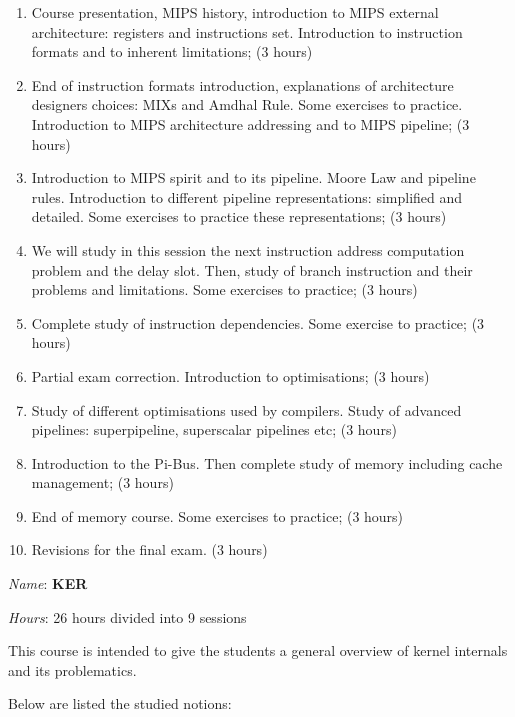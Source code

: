 \begin{multicols}{2}
\begin{enumerate}
  \item
    Course presentation, MIPS history, introduction to MIPS external
    architecture: registers and instructions set. Introduction to
    instruction formats and to inherent limitations; (3 hours)
  \item
    End of instruction formats introduction, explanations of architecture
    designers choices: MIXs and Amdhal Rule. Some exercises to practice.
    Introduction to MIPS architecture addressing and to MIPS pipeline;
    (3 hours)
  \item
    Introduction to MIPS spirit and to its pipeline. Moore Law and
    pipeline rules. Introduction to different pipeline representations:
    simplified and detailed. Some exercises to practice these representations;
    (3 hours)
  \item
    We will study in this session the next instruction address computation
    problem and the delay slot. Then, study of branch instruction and their
    problems and limitations. Some exercises to practice; (3 hours)
  \item
    Complete study of instruction dependencies. Some exercise to practice;
    (3 hours)
  \item
    Partial exam correction. Introduction to optimisations; (3 hours)
  \item
    Study of different optimisations used by compilers. Study of
    advanced pipelines: superpipeline, superscalar pipelines etc; (3 hours)
  \item
    Introduction to the Pi-Bus. Then complete study of memory including
    cache management; (3 hours)
  \item
    End of memory course. Some exercises to practice; (3 hours)
  \item
    Revisions for the final exam. (3 hours)
\end{enumerate}


\textit{Name}: \textbf{KER}

\textit{Hours}: 26 hours divided into 9 sessions

This course is intended to give the students a general overview of
kernel internals and its problematics.

Below are listed the studied notions:


\end{multicols}
